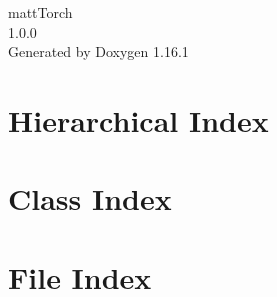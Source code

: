 \documentclass[twoside]{book}
\newcommand{\+}{\discretionary{\mbox{\scriptsize$\hookleftarrow$}}{}{}}
\newcommand{\clearemptydoublepage}{%
    \newpage{\pagestyle{empty}\cleardoublepage}%
  }
\begin{document}
  \raggedbottom
    \hypersetup{pageanchor=false,
                bookmarksnumbered=true,
                pdfencoding=unicode
               }
  \begin{titlepage}
  \vspace*{7cm}
  \begin{center}%
  {\Large matt\+Torch}\\
  [1ex]\large 1.\+0.\+0 \\
  \vspace*{1cm}
  {\large Generated by Doxygen 1.16.1}\\
  \end{center}
  \end{titlepage}
  \clearemptydoublepage
  \tableofcontents
  \clearemptydoublepage
  \hypersetup{pageanchor=true}
\chapter{Hierarchical Index}

\chapter{Class Index}

\chapter{File Index}

\end{document}
